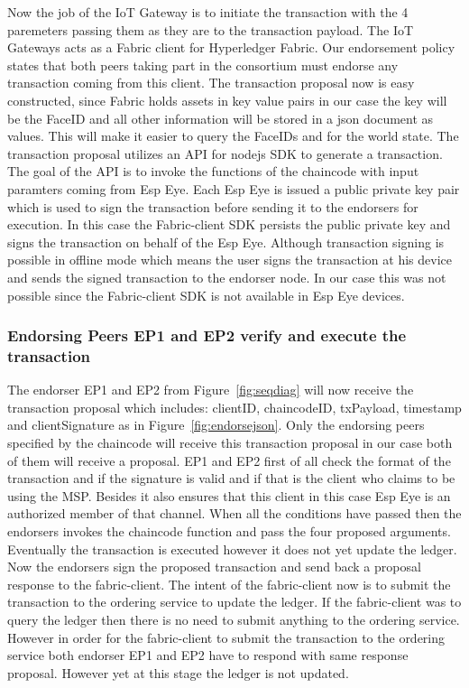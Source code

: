 Now the job of the IoT Gateway is to initiate the transaction with the 4 paremeters passing them as they are to the transaction payload. The IoT Gateways acts as a Fabric client for Hyperledger Fabric. Our endorsement policy states that both peers taking part in the consortium must endorse any transaction coming from this client. The transaction proposal now is easy constructed, since Fabric holds assets in key value pairs in our case the key will be the FaceID and all other information will be stored in a json document as values. This will make it easier to query the FaceIDs and for the world state. The transaction proposal utilizes an API for nodejs SDK to generate a transaction. The goal of the API is to invoke the functions of the chaincode with input paramters coming from Esp Eye. Each Esp Eye is issued a public private key pair which is used to sign the transaction before sending it to the endorsers for execution. In this case the Fabric-client SDK persists the public private key and signs the transaction on behalf of the Esp Eye. Although transaction signing is possible in offline mode which means the user signs the transaction at his device and sends the signed transaction to the endorser node. In our case this was not possible since the Fabric-client SDK is not available in Esp Eye devices. 

\subsubsection{Endorsing Peers EP1 and EP2 verify and execute the transaction}

The endorser EP1 and EP2 from Figure~\ref{fig:seqdiag} will now receive the transaction proposal which includes: clientID, chaincodeID, txPayload, timestamp and clientSignature as in Figure~\ref{fig:endorsejson}. Only the endorsing peers specified by the chaincode will receive this transaction proposal in our case both of them will receive a proposal. EP1 and EP2 first of all check the format of the transaction and if the signature is valid and if that is the client who claims to be using the MSP. Besides it also ensures that this client in this case Esp Eye is an authorized member of that channel. When all the conditions have passed then the endorsers invokes the chaincode function and pass the four proposed arguments. Eventually the transaction is executed however it does not yet update the ledger. Now the endorsers sign the proposed transaction and send back a proposal response to the fabric-client. The intent of the fabric-client now is to submit the transaction to the ordering service to update the ledger. If the fabric-client was to query the ledger then there is no need to submit anything to the ordering service. However in order for the fabric-client to submit the transaction to the ordering service both endorser EP1 and EP2 have to respond with same response proposal. However yet at this stage the ledger is not updated. 

